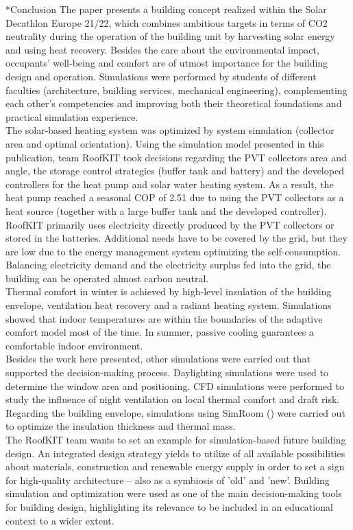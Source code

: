 \documentclass[twocolumn, a4paper,10pt]{article}
\makeatletter
\renewcommand\section{\@startsection{section}{1}{\z@}{3pt}{3pt}{\normalfont\large\bfseries}}
\makeatother
\begin{document}
\section*{Conclusion}
The paper presents a building concept realized within the Solar Decathlon Europe 21/22, which combines ambitious targets in terms of CO2 neutrality during the operation of the building unit by harvesting solar energy and using heat recovery. Besides the care about the environmental impact, occupants' well-being and comfort are of utmost importance for the building design and operation. Simulations were performed by students of different faculties (architecture, building services, mechanical engineering), complementing each other's competencies and improving both their theoretical foundations and practical simulation experience. \\
The solar-based heating system was optimized by system simulation (collector area and optimal orientation). Using the simulation model presented in this publication, team RoofKIT took decisions regarding the PVT collectors area and angle, the storage control strategies (buffer tank and battery) and the developed controllers for the heat pump and solar water heating system. As a result, the heat pump reached a seasonal COP of 2.51 due to using the PVT collectors as a heat source (together with a large buffer tank and the developed controller). RoofKIT primarily uses electricity directly produced by the PVT collectors or stored in the batteries. Additional needs have to be covered by the grid, but they are low due to the energy management system optimizing the self-consumption. Balancing electricity demand  and the electricity surplus fed into the grid, the building can be operated almost carbon neutral. \\
Thermal comfort in winter is achieved by high-level insulation of the building envelope, ventilation heat recovery and a radiant heating system. Simulations showed that indoor temperatures are within the boundaries of the adaptive comfort model most of the time. In summer, passive cooling guarantees a comfortable indoor environment.\\
Besides the work here presented, other simulations were carried out that supported the decision-making process. Daylighting simulations were used to determine the window area and positioning. CFD simulations were performed to study the influence of night ventilation on local thermal comfort and draft risk. Regarding the building envelope, simulations using SimRoom (\citeyear{SimRoom2022}) were carried out to optimize the insulation thickness and thermal mass.\\
The RoofKIT team wants to set an example for simulation-based future building design. An integrated design strategy yields to utilize of all available possibilities about materials, construction and renewable energy supply in order to set a sign for high-quality architecture – also as a symbiosis of 'old' and 'new'. Building simulation and optimization were used as one of the main decision-making tools for building design, highlighting its relevance to be included in an educational context to a wider extent.\\
\end{document}

